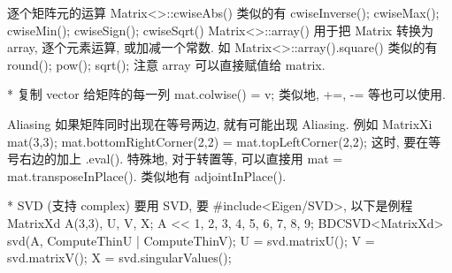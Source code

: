 逐个矩阵元的运算
Matrix<>::cwiseAbs()
类似的有 cwiseInverse(); cwiseMax(); cwiseMin(); cwiseSign(); cwiseSqrt()
Matrix<>::array() 用于把 Matrix 转换为 array, 逐个元素运算, 或加减一个常数. 如 Matrix<>::array().square()
类似的有 round(); pow(); sqrt(); 注意 array 可以直接赋值给 matrix.

* 复制 vector 给矩阵的每一列
mat.colwise() = v; 类似地, +=, -= 等也可以使用.

Aliasing
如果矩阵同时出现在等号两边, 就有可能出现 Aliasing. 例如 MatrixXi mat(3,3);  mat.bottomRightCorner(2,2) = mat.topLeftCorner(2,2); 这时, 要在等号右边的加上 .eval(). 特殊地, 对于转置等, 可以直接用 mat = mat.transposeInPlace(). 类似地有 adjointInPlace().

* SVD (支持 complex)
要用 SVD, 要 #include<Eigen/SVD>, 以下是例程
MatrixXd  A(3,3), U, V, X;
A << 1, 2, 3, 4, 5, 6, 7, 8, 9;
BDCSVD<MatrixXd> svd(A, ComputeThinU | ComputeThinV);
U = svd.matrixU(); V = svd.matrixV(); X = svd.singularValues();
